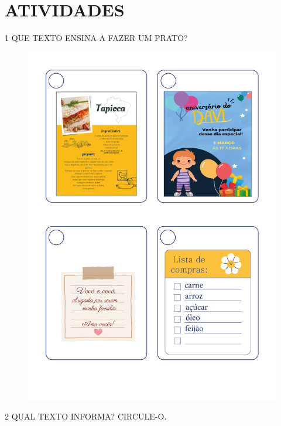 \section*{ATIVIDADES}

\num{1} QUE TEXTO ENSINA A FAZER UM PRATO? 

\begin{figure}[H]
\centering
\includegraphics[width=.95\textwidth]{media/image137a140.png}
\end{figure}

\num{2} QUAL TEXTO INFORMA? CIRCULE-O. 

